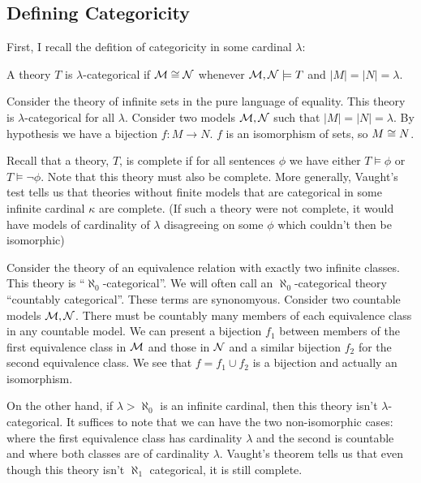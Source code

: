 \subsection{Defining Categoricity}

First, I recall the defition of categoricity in some cardinal \(\lambda\):

\begin{definition}\label{def_categoricity}
A theory \(T\) is \(\lambda\)-categorical if \(\mathcal{M} \cong \mathcal{N}\) whenever \(\mathcal{M}, \mathcal{N} \models T\) and \(|M| = |N| = \lambda\).
\end{definition}

\begin{example}\label{example_categoricity_sets}
Consider the theory of infinite sets in the pure language of equality. 
This theory is \(\lambda\)-categorical for all \(\lambda\).
Consider two models \(\mathcal{M}, \mathcal{N}\) such that \(|M|=|N|=\lambda\). 
By hypothesis we have a bijection \(f: M \to N\). \(f\) is an isomorphism of sets, so \(M \cong N\).
\end{example}

Recall that a theory, \(T\), is complete if for all sentences \(\phi\) we have either \(T \models \phi\) or \(T \models \neg \phi\). 
Note that this theory must also be complete. 
More generally, Vaught's test tells us that theories without finite models that are categorical in some infinite cardinal \(\kappa\) are complete. 
(If such a theory were not complete, it would have models of cardinality of \(\lambda\) disagreeing on some \(\phi\) which couldn't then be isomorphic)

\begin{example}\label{example_categoricity_equiv}
Consider the theory of an equivalence relation with exactly two infinite classes. 
This theory is ``\(\aleph_0\)-categorical''.
We will often call an \(\aleph_0\)-categorical theory ``countably categorical''.
These terms are synonomyous.  
Consider two countable models \(\mathcal{M}, \mathcal{N}\). 
There must be countably many members of each equivalence class in any countable model. 
We can present a bijection \(f_1\) between members of the first equivalence class in  \(\mathcal{M}\) and those in \(\mathcal{N}\) and a similar bijection \(f_2\) for the second equivalence class. 
We see that \(f = f_1 \cup f_2\) is a bijection and actually an isomorphism. 

On the other hand, if \(\lambda > \aleph_0\) is an infinite cardinal, then this theory isn't \(\lambda\)-categorical. 
It suffices to note that we can have the two non-isomorphic cases: where the first equivalence class has cardinality \(\lambda\) and the second is countable 
and where both classes are of cardinality \(\lambda\). Vaught's theorem tells us that even though this theory isn't \(\aleph_1\) categorical, it is still complete. 
\end{example}

